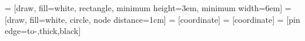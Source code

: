 \documentclass[a4paper,11pt,chap,twoside]{thesis}
\begin{document}
 = [draw, fill=white, rectangle, 
    minimum height=3em, minimum width=6em]
 = [draw, fill=white, circle, node distance=1cm]
 = [coordinate]
 = [coordinate]
 = [pin edge={to-,thick,black}]




\emptypage

\emptypage

\emptypage

\emptypage

\emptypage


\emptypage

\emptypage
\emptypage
\end{document}
